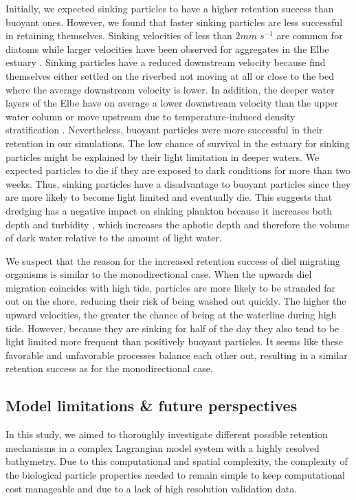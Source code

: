 \documentclass[npg, manuscript]{copernicus}
\begin{document}
Initially, we expected sinking particles to have a higher retention success than buoyant ones. 
However, we found that faster sinking particles are less successful in retaining themselves.
Sinking velocities of less than $2 \unit{mm\;s^{-1}}$ are common for diatoms \citep{Passow1991} while larger velocities have been observed for aggregates in the Elbe estuary \citep{Fennessy1996}.
Sinking particles have a reduced downstream velocity because find themselves either settled on the riverbed not moving at all or close to the bed where the average downstream velocity is lower.
In addition, the deeper water layers of the Elbe have on average a lower downstream velocity than the upper water column or move upstream  due to temperature-induced density stratification \citep{Pein2021}.
Nevertheless, buoyant particles were more successful in their retention in our simulations.
The low chance of survival in the estuary for sinking particles might be explained by their light limitation in deeper waters.
We expected particles to die if they are exposed to dark conditions for more than two weeks.
Thus, sinking particles have a disadvantage to buoyant particles since they are more likely to become light limited and eventually die.
This suggests that dredging has a negative impact on sinking plankton because it increases both depth and turbidity \citep{DeJonge2014}, which increases the aphotic depth and therefore the volume of dark water relative to the amount of light water.

We suspect that the reason for the increased retention success of diel migrating organisms is similar to the monodirectional case.
When the upwards diel migration coincides with high tide, particles are more likely to be stranded far out on the shore, reducing their risk of being washed out quickly.
The higher the upward velocities, the greater the chance of being at the waterline during high tide.
However, because they are sinking for half of the day they also tend to be light limited more frequent than positively buoyant particles.
It seems like these favorable and unfavorable processes balance each other out, resulting in a similar retention success as for the monodirectional case.


\subsection{Model limitations \& future perspectives}

In this study, we aimed to thoroughly investigate different possible retention mechanisms in a complex Lagrangian model system with a highly resolved bathymetry.  
Due to this computational and spatial complexity, the complexity of the biological particle properties needed to remain simple to keep computational cost manageable and due to a lack of high resolution validation data.
\end{document}
